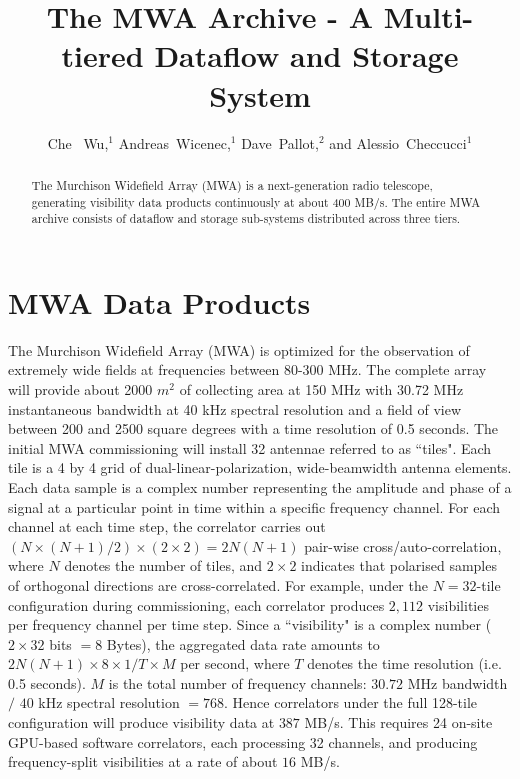 



\title{The MWA Archive - A Multi-tiered Dataflow and Storage System}
\author{Che~ Wu,$^1$ Andreas~Wicenec,$^1$ Dave~Pallot,$^2$ and Alessio~Checcucci$^1$
}


\begin{abstract}
The Murchison Widefield Array (MWA) is a next-generation radio telescope, generating visibility data products continuously at about 400 MB/s. The entire MWA archive consists of dataflow and storage sub-systems distributed across three tiers.
\end{abstract}


\section{MWA Data Products}
The Murchison Widefield Array (MWA) is optimized for the observation of extremely wide fields at frequencies between 80-300 MHz. 
The complete array will provide about 2000 $m^2$ of collecting area at 150 MHz with 30.72 MHz instantaneous bandwidth at 40 kHz spectral resolution and a field of view between 200 and 2500 square degrees with a time resolution of 0.5 seconds. The initial MWA commissioning will install 32 antennae referred to as ``tiles". Each tile is a 4 by 4 grid of dual-linear-polarization, wide-beamwidth antenna elements. Each data sample is a complex number representing the amplitude and phase of a signal at a particular point in time within a specific frequency channel. For each channel at each time step, the correlator carries out \((N \times (N + 1) / 2) \times (2  \times 2) = 2N(N+1) \) pair-wise cross/auto-correlation, where \(N\) denotes the number of tiles, and \(2 \times 2 \) indicates that polarised samples of orthogonal directions are cross-correlated. For example,  under the \(N=32\)-tile configuration during commissioning, each correlator produces \(2,112\) visibilities per frequency channel per time step. Since a ``visibility" is a complex number (\(2 \times 32\) bits \(= 8\) Bytes), the aggregated data rate amounts to \( 2N(N+1) \times 8 \times 1/T \times M\) per second, where \(T\) denotes the time resolution (i.e. 0.5 seconds). \(M\) is the total number of frequency channels: \(30.72\) MHz bandwidth \(/\) \(40\) kHz spectral resolution \(= 768\). Hence correlators under the full 128-tile configuration will produce visibility data at \(387\) MB/s. This requires 24 on-site GPU-based software correlators, each processing 32 channels, and producing frequency-split visibilities at a rate of about \(16\) MB/s. 

